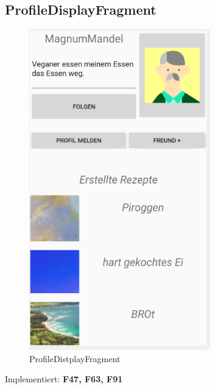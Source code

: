 \subsection{ProfileDisplayFragment}
\begin{figure}[H]
	\centering
	\includegraphics[width=0.7\textwidth]{pics/profilDistplayFragment.png}%
	\caption{ProfileDistplayFragment}%
	\label{view}%
\end{figure}
Implementiert: \textbf{F47, F63, F91}
